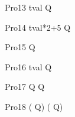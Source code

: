 \begin{circus}
    \circprocess Pro13 \circdef  \lcirctime tval \rcirctime \circstartby Q\\
\end{circus}        

\begin{circus}
   \circprocess Pro14 \circdef \lcirctime tval*2+5 \rcirctime \circstartby Q \\
\end{circus}        

\begin{circus}
    \circprocess Pro15 \circdef  {}  \rcirctime \circstartby Q \\
\end{circus}        

\begin{circus}
    \circprocess Pro16 \circdef  {} \upto tval \rcirctime \circstartby Q \\
\end{circus} 



\begin{circus}
    \circprocess Pro17 \circdef {} \rcirctime \circstartby Q \circinterrupt  {} \rcirctime \circstartby Q \\ 
\end{circus}
    
\begin{circus}
    \circprocess Pro18 \circdef (  \rcirctime \circstartby Q) \circinterrupt (  \rcirctime \circstartby Q) \\
\end{circus}




